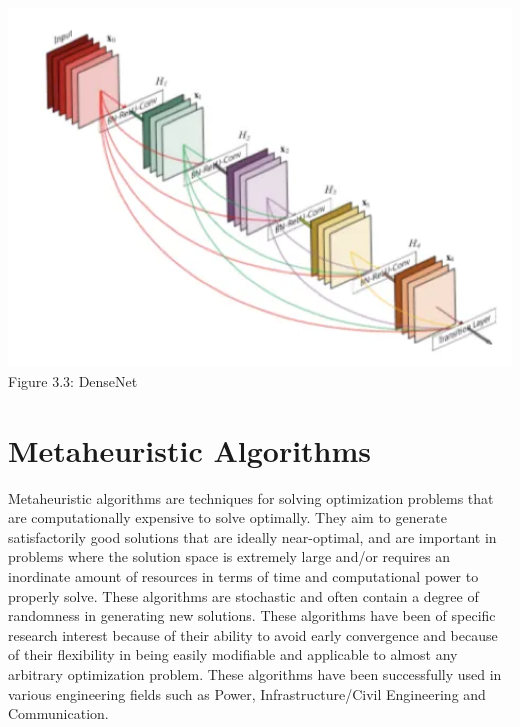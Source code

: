 \begin{center}
   \includegraphics[width=6in]{images/3.3.png} 
   \\\fontsize{11pt}{24pt} Figure 3.3: DenseNet
\end{center}

				
\section{Metaheuristic Algorithms}
Metaheuristic algorithms are techniques for solving optimization problems that are computationally expensive to solve optimally. They aim to generate satisfactorily good solutions that are ideally near-optimal, and are important in problems where the solution space is extremely large and/or requires an inordinate amount of resources in terms of time and computational power to properly solve. These algorithms are stochastic and often contain a degree of randomness in generating new solutions. These algorithms have been of specific research interest because of their ability to avoid early convergence and because of their flexibility in being easily modifiable and applicable to almost any arbitrary optimization problem. These algorithms have been successfully used in various engineering fields such as Power, Infrastructure/Civil Engineering and Communication. 

